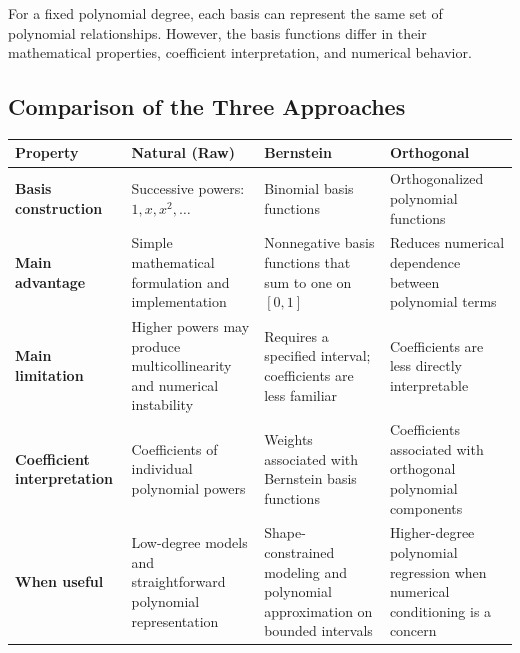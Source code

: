 \documentclass[
  letterpaper,
  DIV=11,
  numbers=noendperiod]{scrreprt}
\newcounter{none} %
\begin{document}
For a fixed polynomial degree, each basis can represent the same set of
polynomial relationships. However, the basis functions differ in their
mathematical properties, coefficient interpretation, and numerical
behavior.

\subsection{Comparison of the Three
Approaches}\label{comparison-of-the-three-approaches}

{\def\LTcaptype{none} %
\begin{longtable}[]{@{}
  >{\raggedright\arraybackslash}p{}
  >{\raggedright\arraybackslash}p{}
  >{\raggedright\arraybackslash}p{}
  >{\raggedright\arraybackslash}p{}@{}}
\toprule\noalign{}
\begin{minipage}[b]{\linewidth}\raggedright
Property
\end{minipage} & \begin{minipage}[b]{\linewidth}\raggedright
Natural (Raw)
\end{minipage} & \begin{minipage}[b]{\linewidth}\raggedright
Bernstein
\end{minipage} & \begin{minipage}[b]{\linewidth}\raggedright
Orthogonal
\end{minipage} \\
\midrule\noalign{}
\endhead
\bottomrule\noalign{}
\endlastfoot
\textbf{Basis construction} & Successive powers: \(1,x,x^2,\ldots\) &
Binomial basis functions & Orthogonalized polynomial functions \\
\textbf{Main advantage} & Simple mathematical formulation and
implementation & Nonnegative basis functions that sum to one on
\([0,1]\) & Reduces numerical dependence between polynomial terms \\
\textbf{Main limitation} & Higher powers may produce multicollinearity
and numerical instability & Requires a specified interval; coefficients
are less familiar & Coefficients are less directly interpretable \\
\textbf{Coefficient interpretation} & Coefficients of individual
polynomial powers & Weights associated with Bernstein basis functions &
Coefficients associated with orthogonal polynomial components \\
\textbf{When useful} & Low-degree models and straightforward polynomial
representation & Shape-constrained modeling and polynomial approximation
on bounded intervals & Higher-degree polynomial regression when
numerical conditioning is a concern \\
\end{longtable}
}
\end{document}
